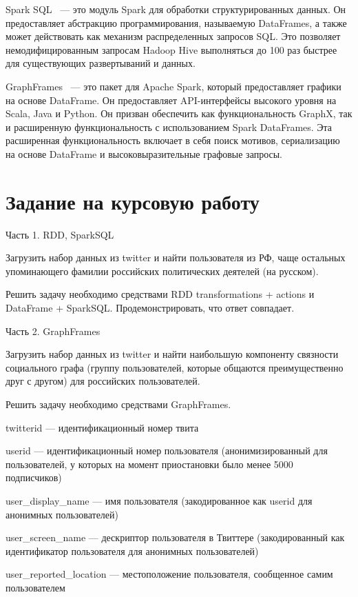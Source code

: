Spark SQL~\cite{bib:sql1, bib:sql2, bib:sql3} — это модуль Spark для обработки структурированных данных. Он предоставляет абстракцию программирования, называемую DataFrames, а также может действовать как механизм распределенных запросов SQL. Это позволяет немодифицированным запросам Hadoop Hive выполняться до 100 раз быстрее для существующих развертываний и данных.

GraphFrames~\cite{bib:gf1, bib:gf2, bib:gf3, bib:gf4} — это пакет для Apache Spark, который предоставляет графики на основе DataFrame. Он предоставляет API-интерфейсы высокого уровня на Scala, Java и Python. Он призван обеспечить как функциональность GraphX, так и расширенную функциональность с использованием Spark DataFrames. Эта расширенная функциональность включает в себя поиск мотивов, сериализацию на основе DataFrame и высоковыразительные графовые запросы.


\section{Задание на курсовую работу}

Часть 1. RDD, SparkSQL

Загрузить набор данных из twitter и найти пользователя из РФ, чаще остальных упоминающего фамилии российских политических деятелей (на русском).

Решить задачу необходимо средствами RDD transformations + actions и DataFrame + SparkSQL. Продемонстрировать, что ответ совпадает.

Часть 2. GraphFrames

Загрузить набор данных из twitter и найти наибольшую компоненту связности социального графа (группу пользователей, которые общаются преимущественно друг с другом) для российских пользователей.

Решить задачу необходимо средствами GraphFrames.

twitterid — идентификационный номер твита

userid — идентификационный номер пользователя (анонимизированный для пользователей, у которых на момент приостановки было менее 5000 подписчиков)

user\_display\_name — имя пользователя (закодированное как userid для анонимных пользователей)

user\_screen\_name — дескриптор пользователя в Твиттере (закодированный как идентификатор пользователя для анонимных пользователей)

user\_reported\_location — местоположение пользователя, сообщенное самим пользователем

